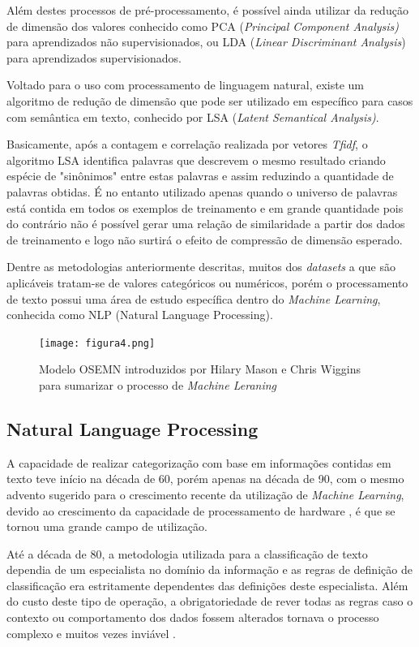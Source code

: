 \documentclass[conference]{IEEEtran}
\begin{document}
Além destes processos de pré-processamento, é possível ainda utilizar da redução de dimensão dos valores conhecido como PCA (\textit{Principal Component Analysis)} para aprendizados não supervisionados, ou LDA (\textit{Linear Discriminant Analysis}) para aprendizados supervisionados. 

Voltado para o uso com processamento de linguagem natural, existe um algoritmo de redução de dimensão que pode ser utilizado em específico para casos com semântica em texto, conhecido por LSA (\textit{Latent Semantical Analysis)}. 

Basicamente, após a contagem e correlação realizada por vetores \textit{Tfidf}, o algoritmo LSA identifica palavras que descrevem o mesmo resultado criando espécie de "sinônimos" entre estas palavras e assim reduzindo a quantidade de palavras obtidas. É no entanto utilizado apenas quando o universo de palavras está contida em todos os exemplos de treinamento e em grande quantidade \cite{pythondatascience} pois do contrário não é possível gerar uma relação de similaridade a partir dos dados de treinamento e logo não surtirá o efeito de compressão de dimensão esperado.

Dentre as metodologias anteriormente descritas, muitos dos \textit{datasets} a que são aplicáveis tratam-se de valores categóricos ou numéricos, porém o processamento de texto possui uma área de estudo específica dentro do \textit{Machine Learning}, conhecida como NLP (Natural Language Processing).

\begin{figure}[h]
\centerline{\texttt{[image: figura4.png]}}
\caption{Modelo OSEMN introduzidos por Hilary Mason e Chris Wiggins para sumarizar o processo de \textit{Machine Leraning} \cite{pythondatascience}}
\label{fig}
\end{figure}

\subsection{Natural Language Processing}

A capacidade de realizar categorização com base em informações contidas em texto teve início na década de 60, porém apenas na década de 90, com o mesmo advento sugerido para o crescimento recente da utilização de \textit{Machine Learning}, devido ao crescimento da capacidade de processamento de hardware \cite{Sebastiani:2002:MLA:505282.505283}, é que se tornou uma grande campo de utilização. 

Até a década de 80, a metodologia utilizada para a classificação de texto dependia de um especialista no domínio da informação e as regras de definição de classificação era estritamente dependentes das definições deste especialista. Além do custo deste tipo de operação, a obrigatoriedade de rever todas as regras caso o contexto ou comportamento dos dados fossem alterados tornava o processo complexo e muitos vezes inviável \cite{Sebastiani:2002:MLA:505282.505283}.
\end{document}
